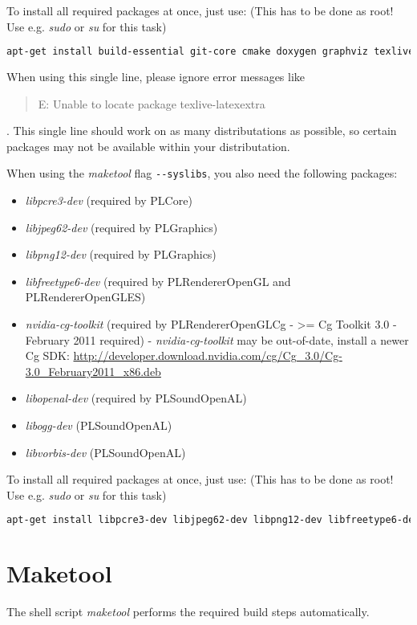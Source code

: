 To install all required packages at once, just use: (This has to be done as root! Use e.g. \emph{sudo} or \emph{su} for this task)
\begin{lstlisting}[language=bash]
apt-get install build-essential git-core cmake doxygen graphviz texlive texlive-science texlive-latex-extra texlive-latexextra texlive-latex3 dvipdfm dvipdfmx libncurses5-dev libzip-dev libxcursor-dev libxext-dev libdbus-1-dev libxxf86vm-dev libglu1-mesa-dev libxrandr-dev
\end{lstlisting}
When using this single line, please ignore error messages like \begin{quote}E: Unable to locate package texlive-latexextra\end{quote}. This single line should work on as many distributations as possible, so certain packages may not be available within your distributation.

When using the \emph{maketool} flag \verb+--syslibs+, you also need the following packages:
\begin{itemize}
\item{\emph{libpcre3-dev} (required by PLCore)}
\item{\emph{libjpeg62-dev} (required by PLGraphics)}
\item{\emph{libpng12-dev} (required by PLGraphics)}
\item{\emph{libfreetype6-dev} (required by PLRendererOpenGL and PLRendererOpenGLES)}
\item{\emph{nvidia-cg-toolkit} (required by PLRendererOpenGLCg - >= Cg Toolkit 3.0 - February 2011 required) - \emph{nvidia-cg-toolkit} may be out-of-date, install a newer Cg SDK: \url{http://developer.download.nvidia.com/cg/Cg_3.0/Cg-3.0_February2011_x86.deb}}
\item{\emph{libopenal-dev} (required by PLSoundOpenAL)}
\item{\emph{libogg-dev} (PLSoundOpenAL)}
\item{\emph{libvorbis-dev} (PLSoundOpenAL)}
\end{itemize}

To install all required packages at once, just use: (This has to be done as root! Use e.g. \emph{sudo} or \emph{su} for this task)
\begin{lstlisting}[language=bash]
apt-get install libpcre3-dev libjpeg62-dev libpng12-dev libfreetype6-dev libopenal-dev libogg-dev libvorbis-dev
\end{lstlisting}




\section{Maketool}
The shell script \emph{maketool} performs the required build steps automatically.

